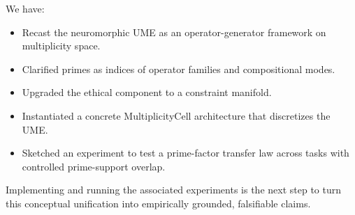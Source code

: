 \documentclass[11pt]{article}
\begin{document}
We have:
\begin{itemize}[nosep]
\item Recast the neuromorphic UME as an operator-generator framework on multiplicity space.
\item Clarified primes as indices of operator families and compositional modes.
\item Upgraded the ethical component to a constraint manifold.
\item Instantiated a concrete MultiplicityCell architecture that discretizes the UME.
\item Sketched an experiment to test a prime-factor transfer law across tasks with controlled prime-support overlap.
\end{itemize}

Implementing and running the associated experiments is the next step to turn this conceptual unification into empirically grounded, falsifiable claims.

\nocite{*}


\end{document}

